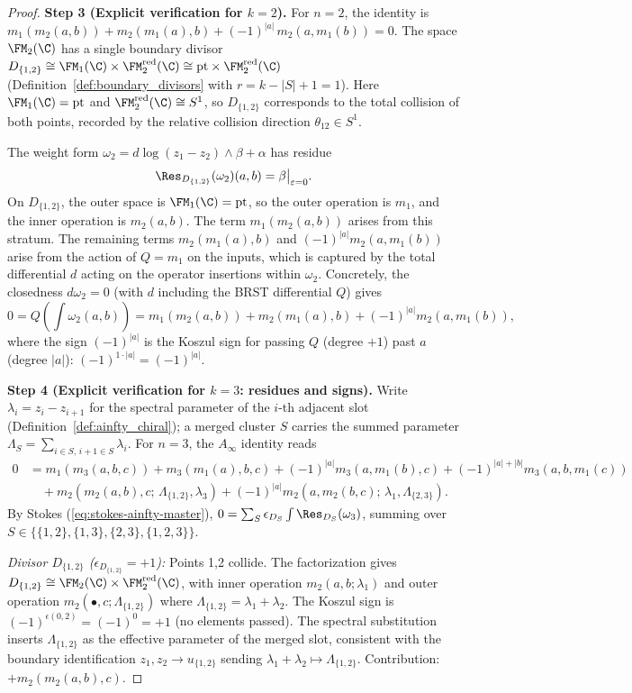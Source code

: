 \begin{proof}
\medskip
\textbf{Step 3 (Explicit verification for $k = 2$).}
For $n = 2$, the identity is $m_1(m_2(a,b)) + m_2(m_1(a),b) + (-1)^{|a|}\,m_2(a,m_1(b)) = 0$. The space $\FM_2(\C)$ has a single boundary divisor $D_{\{1,2\}} \cong \FM_1(\C) \times \FM_2^{\mathrm{red}}(\C) \cong \mathrm{pt} \times \FM_2^{\mathrm{red}}(\C)$ (Definition~\ref{def:boundary_divisors} with $r = k - |S| + 1 = 1$). Here $\FM_1(\C) = \mathrm{pt}$ and $\FM_2^{\mathrm{red}}(\C) \cong S^1$, so $D_{\{1,2\}}$ corresponds to the total collision of both points, recorded by the relative collision direction $\theta_{12} \in S^1$.

The weight form $\omega_2 = d\log(z_1 - z_2) \wedge \beta + \alpha$ has residue
\[
\Res_{D_{\{1,2\}}}(\omega_2)(a,b) = \beta\big|_{\varepsilon = 0}.
\]
On $D_{\{1,2\}}$, the outer space is $\FM_1(\C) = \mathrm{pt}$, so the outer operation is $m_1$, and the inner operation is $m_2(a,b)$. The term $m_1(m_2(a,b))$ arises from this stratum. The remaining terms $m_2(m_1(a),b)$ and $(-1)^{|a|}m_2(a,m_1(b))$ arise from the action of $Q = m_1$ on the inputs, which is captured by the total differential $d$ acting on the operator insertions within $\omega_2$. Concretely, the closedness $d\omega_2 = 0$ (with $d$ including the BRST differential $Q$) gives
\[
0 = Q\!\left(\int \omega_2(a,b)\right) = m_1(m_2(a,b)) + m_2(m_1(a),b) + (-1)^{|a|}m_2(a,m_1(b)),
\]
where the sign $(-1)^{|a|}$ is the Koszul sign for passing $Q$ (degree $+1$) past $a$ (degree $|a|$): $(-1)^{1 \cdot |a|} = (-1)^{|a|}$.

\medskip
\textbf{Step 4 (Explicit verification for $k = 3$: residues and signs).}
Write $\lambda_i = z_i - z_{i+1}$ for the spectral parameter of the $i$-th adjacent slot (Definition~\ref{def:ainfty_chiral}); a merged cluster $S$ carries the summed parameter $\Lambda_S = \sum_{i \in S,\, i+1 \in S} \lambda_i$. For $n = 3$, the $A_\infty$ identity reads
\begin{align*}
0 &= m_1(m_3(a,b,c)) + m_3(m_1(a),b,c) + (-1)^{|a|} m_3(a,m_1(b),c) + (-1)^{|a|+|b|} m_3(a,b,m_1(c)) \\
&\quad + m_2(m_2(a,b),c;\,\Lambda_{\{1,2\}},\lambda_3) + (-1)^{|a|} m_2(a,m_2(b,c);\,\lambda_1,\Lambda_{\{2,3\}}).
\end{align*}
By Stokes (\ref{eq:stokes-ainfty-master}), $0 = \sum_S \epsilon_{D_S} \int \Res_{D_S}(\omega_3)$, summing over $S \in \{\{1,2\},\{1,3\},\{2,3\},\{1,2,3\}\}$.

\emph{Divisor $D_{\{1,2\}}$ ($\epsilon_{D_{\{1,2\}}} = +1$):}
Points 1,2 collide. The factorization gives $D_{\{1,2\}} \cong \FM_2(\C) \times \FM_2^{\mathrm{red}}(\C)$, with inner operation $m_2(a,b;\lambda_1)$ and outer operation $m_2(\bullet, c;\Lambda_{\{1,2\}})$ where $\Lambda_{\{1,2\}} = \lambda_1 + \lambda_2$. The Koszul sign is $(-1)^{\epsilon(0,2)} = (-1)^0 = +1$ (no elements passed). The spectral substitution inserts $\Lambda_{\{1,2\}}$ as the effective parameter of the merged slot, consistent with the boundary identification $z_1, z_2 \to u_{\{1,2\}}$ sending $\lambda_1 + \lambda_2 \mapsto \Lambda_{\{1,2\}}$. Contribution: $+m_2(m_2(a,b),c)$.


\end{proof}
